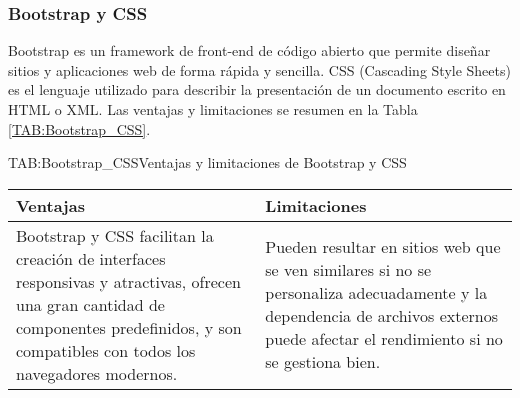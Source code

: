 \subsubsection{Bootstrap y CSS}

Bootstrap es un framework de front-end de código abierto que permite diseñar sitios y aplicaciones web de forma rápida y sencilla. CSS (Cascading Style Sheets) es el lenguaje utilizado para describir la presentación de un documento escrito en HTML o XML. Las ventajas y limitaciones se resumen en la Tabla \ref{TAB:Bootstrap_CSS}.

\begin{table}[Bootstrap y CSS]{TAB:Bootstrap_CSS}{Ventajas y limitaciones de Bootstrap y CSS}
  \begin{tabular}{|p{7cm}|p{7cm}|}
    \hline
    \textbf{Ventajas} & \textbf{Limitaciones} \\
    \hline
    Bootstrap y CSS facilitan la creación de interfaces responsivas y atractivas, ofrecen una gran cantidad de componentes predefinidos, y son compatibles con todos los navegadores modernos. & Pueden resultar en sitios web que se ven similares si no se personaliza adecuadamente y la dependencia de archivos externos puede afectar el rendimiento si no se gestiona bien. \\
    \hline
  \end{tabular}
\end{table}